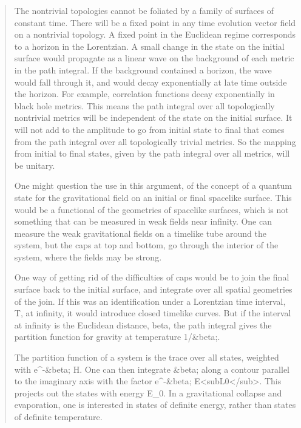 \begin{quote}
     The nontrivial topologies cannot be foliated by a family of
     surfaces of constant time. There will be a fixed point in any time
     evolution vector field on a nontrivial topology.  A fixed point in 
     the Euclidean regime corresponds to a horizon in the Lorentzian. 
     A small change in the state on the initial surface would propagate as 
     a linear wave on the background of each metric in the path integral. 
     If the background contained a horizon, the wave would fall through it,
     and would decay exponentially at late time outside the horizon.  For
     example, correlation functions decay exponentially in black hole
     metrics.  This means the path integral over all topologically
     nontrivial metrics will be independent of the state on the initial
     surface.  It will not add to the amplitude to go from initial state to
     final that comes from the path integral over all topologically
     trivial metrics. So the mapping from initial to final states, given 
     by the path integral over all metrics, will be unitary.  

     One might question the use in this argument, of the concept of a 
     quantum state for the gravitational field on an initial or final 
     spacelike surface.  This would be a functional of the geometries of 
     spacelike surfaces, which is not something that can be measured in 
     weak fields near infinity.  One can measure the weak gravitational 
     fields on a timelike tube around the system, but the caps at top and 
     bottom, go through the interior of the system, where the fields may 
     be strong.

     One way of getting rid of the difficulties of caps would be to join
     the final surface back to the initial surface, and integrate over all
     spatial geometries of the join.  If this was an identification under a
     Lorentzian time interval, T, at infinity, it would introduce closed
     timelike curves. But if the interval at infinity is the Euclidean
     distance, beta, the path integral gives the partition function for
     gravity at temperature 1/&beta;.

     The partition function of a system is the trace over all states,
     weighted with e^{-&beta; H}.  One can then integrate &beta; along
     a contour parallel to the imaginary axis with the factor e^{-&beta; E<subL0</sub>}.
     This projects out the states with energy E_{0}. In a gravitational 
     collapse and evaporation, one is interested in states of
     definite energy, rather than states of definite temperature.


\end{quote}
